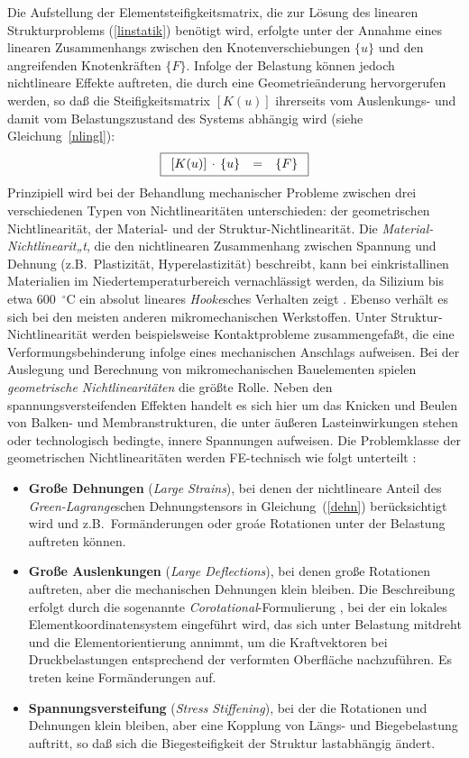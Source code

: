 Die Aufstellung der Elementsteifigkeitsmatrix, die zur Lösung des linearen
Strukturproblems (\ref{linstatik}) benötigt wird, erfolgte unter der Annahme
eines linearen Zusammenhangs zwischen den Knotenverschiebungen $\{u\}$ und
den angreifenden Knotenkräften $\{F\}$. Infolge der Belastung können jedoch
nichtlineare Effekte auftreten, die durch eine
Geometrieänderung hervorgerufen werden, so daß die Steifigkeitsmatrix
$[K(u)]$ ihrerseits vom Auslenkungs- und damit vom Belastungszustand des
Systems abhängig wird (siehe Gleichung~\ref{nlingl}):
\begin{equation}
\label{nlstatik}
\fbox{$
 \displaystyle
 \begin{array}{rcl}
 [K(u)] \, \cdot \, \{u\} & = & \{F\}
 \end{array}
 $}
\end{equation}
Prinzipiell wird bei der Behandlung mechanischer Probleme
zwischen drei verschiedenen Typen von
Nichtlinearitäten unterschieden: der geometrischen Nichtlinearität,
der Material- und der Struktur-Nichtlinearität. Die
{\em Material-Nichtlinearit„t}, die den nichtlinearen Zusammenhang zwischen
Spannung und Dehnung (z.B.\ Plastizität, Hyperelastizität) beschreibt,
kann bei
einkristallinen Materialien im Niedertemperaturbereich vernachlässigt
werden, da Silizium bis etwa 600~$^\circ$C ein absolut lineares
{\sl Hooke}sches Verhalten zeigt \cite{Ove77}.
Ebenso verhält es sich bei den
meisten anderen mikromechanischen Werkstoffen. Unter Struktur-Nichtlinearität
werden beispielsweise Kontaktprobleme zusammengefaßt, die eine
Verformungsbehinderung infolge eines mechanischen Anschlags aufweisen.
Bei der Auslegung und Berechnung von mikromechanischen Bauelementen spielen
{\em geometrische Nichtlinearitäten} die größte Rolle. Neben den
spannungsversteifenden Effekten handelt es sich hier um das Knicken und
Beulen von Balken- und Membranstrukturen, die unter äußeren Lasteinwirkungen
stehen oder technologisch bedingte, innere Spannungen aufweisen. Die
Problemklasse der geometrischen Nichtlinearitäten werden FE-technisch wie
folgt unterteilt \cite{Koh92}:
%
\begin{itemize}
\item
{\bf Große Dehnungen} ({\em Large Strains}),
bei denen der nichtlineare Anteil des {\sl Green-Lagrange}schen
Dehnungstensors in Gleichung~(\ref{dehn}) berücksichtigt wird und z.B.\
Formänderungen oder groáe Rotationen unter der Belastung auftreten können.
\item
{\bf Große Auslenkungen} ({\em Large Deflections}), bei denen große
Rotationen auftreten, aber die mechanischen Dehnungen klein bleiben.
Die Beschreibung erfolgt durch die sogenannte
{\em Corotational}-Formulierung \cite{Ran86}, bei der ein lokales
Elementkoordinatensystem eingeführt wird, das sich unter Belastung mitdreht
und die Element\-orientierung annimmt, um die Kraftvektoren bei
Druckbelastungen entsprechend der verformten Oberfläche nachzuführen.
Es treten keine Formänderungen auf.
\item
{\bf Spannungsversteifung} ({\em Stress Stiffening}), bei der die Rotationen
und Dehnungen klein bleiben, aber eine Kopplung von Längs- und
Biegebelastung auftritt, so daß sich die Biegesteifigkeit der Struktur
lastabhängig ändert.
\end{itemize}
